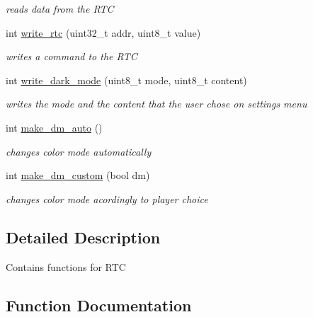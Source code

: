 \begin{DoxyCompactItemize}
\begin{DoxyCompactList}\small\item\em reads data from the R\+TC \end{DoxyCompactList}\item 
int \hyperlink{group__RealTimeClock_ga22b6726ecbb76b91e8cbe61bfbc06595}{write\+\_\+rtc} (uint32\+\_\+t addr, uint8\+\_\+t value)
\begin{DoxyCompactList}\small\item\em writes a command to the R\+TC \end{DoxyCompactList}\item 
int \hyperlink{group__RealTimeClock_gab680718c3cc588942fae4b697a99a7a3}{write\+\_\+dark\+\_\+mode} (uint8\+\_\+t mode, uint8\+\_\+t content)
\begin{DoxyCompactList}\small\item\em writes the mode and the content that the user chose on settings menu \end{DoxyCompactList}\item 
int \hyperlink{group__RealTimeClock_ga7e3748780d4ab4b2f87949e477dba28c}{make\+\_\+dm\+\_\+auto} ()
\begin{DoxyCompactList}\small\item\em changes color mode automatically \end{DoxyCompactList}\item 
int \hyperlink{group__RealTimeClock_ga6dc7d0ef0bd75dbcf8581510fe4b224a}{make\+\_\+dm\+\_\+custom} (bool dm)
\begin{DoxyCompactList}\small\item\em changes color mode acordingly to player choice \end{DoxyCompactList}\end{DoxyCompactItemize}


\subsection{Detailed Description}
Contains functions for R\+TC 

\subsection{Function Documentation}
\mbox{\label{group__RealTimeClock_ga3712be4b01789095104f73d8a0488e10}} 
